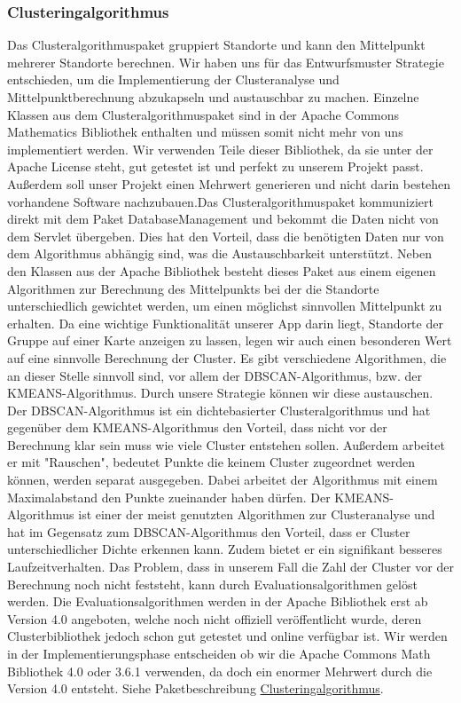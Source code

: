 \subsubsection{Clusteringalgorithmus}

Das Clusteralgorithmuspaket gruppiert Standorte und kann den Mittelpunkt mehrerer Standorte berechnen. Wir haben uns für das Entwurfsmuster Strategie entschieden, um die Implementierung der Clusteranalyse und Mittelpunktberechnung abzukapseln und austauschbar zu machen. Einzelne Klassen aus dem Clusteralgorithmuspaket sind in der Apache Commons Mathematics Bibliothek enthalten und müssen somit nicht mehr von uns implementiert werden. Wir verwenden Teile dieser Bibliothek, da sie unter der Apache License steht, gut getestet ist und perfekt zu unserem Projekt passt. Außerdem soll unser Projekt einen Mehrwert generieren und nicht darin bestehen vorhandene Software nachzubauen.\newline Das Clusteralgorithmuspaket kommuniziert direkt mit dem Paket DatabaseManagement und bekommt die Daten nicht von dem Servlet übergeben. Dies hat den Vorteil, dass die benötigten Daten nur von dem Algorithmus abhängig sind, was die Austauschbarkeit unterstützt. Neben den Klassen aus der Apache Bibliothek besteht dieses Paket aus einem eigenen Algorithmen zur Berechnung des Mittelpunkts bei der die Standorte unterschiedlich gewichtet werden, um einen möglichst sinnvollen Mittelpunkt zu erhalten. Da eine wichtige Funktionalität unserer App darin liegt, Standorte der Gruppe auf einer Karte anzeigen zu lassen, legen wir auch einen besonderen Wert auf eine sinnvolle Berechnung der Cluster.\newline
 Es gibt verschiedene Algorithmen, die an dieser Stelle sinnvoll sind, vor allem der DBSCAN-Algorithmus, bzw. der KMEANS-Algorithmus. Durch unsere Strategie können wir diese austauschen. Der DBSCAN-Algorithmus ist ein dichtebasierter Clusteralgorithmus und hat gegenüber dem KMEANS-Algorithmus den Vorteil, dass nicht vor der Berechnung klar sein muss wie viele Cluster entstehen sollen. Außerdem arbeitet er mit "Rauschen", bedeutet Punkte die keinem Cluster zugeordnet werden können, werden separat ausgegeben. Dabei arbeitet der Algorithmus mit einem Maximalabstand den Punkte zueinander haben dürfen. 
Der KMEANS-Algorithmus ist einer der meist genutzten Algorithmen zur Clusteranalyse und hat im Gegensatz zum DBSCAN-Algorithmus den Vorteil, dass er Cluster unterschiedlicher Dichte erkennen kann. Zudem bietet er ein signifikant besseres Laufzeitverhalten. Das Problem, dass in unserem Fall die Zahl der Cluster vor der Berechnung noch nicht feststeht, kann durch Evaluationsalgorithmen gelöst werden. Die Evaluationsalgorithmen werden in der Apache Bibliothek erst ab Version 4.0 angeboten, welche noch nicht offiziell veröffentlicht wurde, deren Clusterbibliothek jedoch schon gut getestet und online verfügbar ist.
Wir werden in der Implementierungsphase entscheiden ob wir die Apache Commons Math Bibliothek 4.0 oder 3.6.1 verwenden, da doch ein enormer Mehrwert durch die Version 4.0 entsteht.
\newline
Siehe Paketbeschreibung \hyperlink{algorithm}{Clusteringalgorithmus}.
  \newline
 
